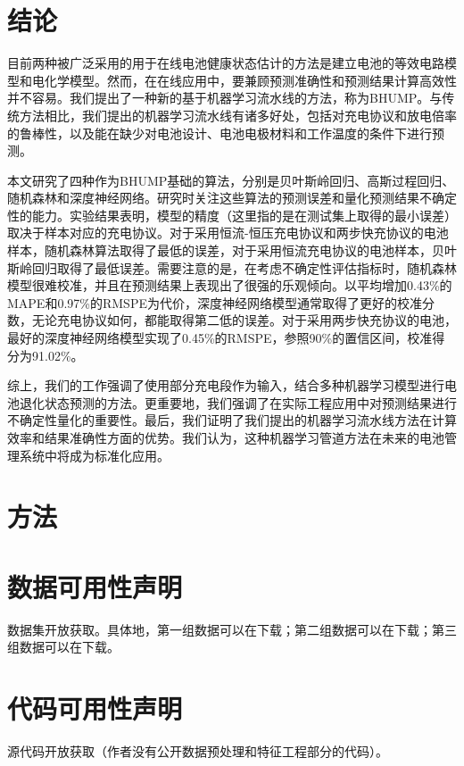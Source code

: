 \documentclass{article}
\begin{document}
\section{结论}

目前两种被广泛采用的用于在线电池健康状态估计的方法是建立电池的等效电路模型和电化学模型。然而，在在线应用中，要兼顾预测准确性和预测结果计算高效性并不容易。我们提出了一种新的基于机器学习流水线的方法，称为BHUMP。与传统方法相比，我们提出的机器学习流水线有诸多好处，包括对充电协议和放电倍率的鲁棒性，以及能在缺少对电池设计、电池电极材料和工作温度的条件下进行预测。

本文研究了四种作为BHUMP基础的算法，分别是贝叶斯岭回归、高斯过程回归、随机森林和深度神经网络。研究时关注这些算法的预测误差和量化预测结果不确定性的能力。实验结果表明，模型的精度（这里指的是在测试集上取得的最小误差）取决于样本对应的充电协议。对于采用恒流-恒压充电协议和两步快充协议的电池样本，随机森林算法取得了最低的误差，对于采用恒流充电协议的电池样本，贝叶斯岭回归取得了最低误差。需要注意的是，在考虑不确定性评估指标时，随机森林模型很难校准，并且在预测结果上表现出了很强的乐观倾向。以平均增加0.43\%的MAPE和0.97\%的RMSPE为代价，深度神经网络模型通常取得了更好的校准分数，无论充电协议如何，都能取得第二低的误差。对于采用两步快充协议的电池，最好的深度神经网络模型实现了0.45\%的RMSPE，参照90\%的置信区间，校准得分为91.02\%。

综上，我们的工作强调了使用部分充电段作为输入，结合多种机器学习模型进行电池退化状态预测的方法。更重要地，我们强调了在实际工程应用中对预测结果进行不确定性量化的重要性。最后，我们证明了我们提出的机器学习流水线方法在计算效率和结果准确性方面的优势。我们认为，这种机器学习管道方法在未来的电池管理系统中将成为标准化应用。

\section{方法}

\section{数据可用性声明}

数据集开放获取。具体地，第一组数据可以在下载；第二组数据可以在下载；第三组数据可以在下载。

\section{代码可用性声明}

源代码开放获取（作者没有公开数据预处理和特征工程部分的代码）。



\end{document}
